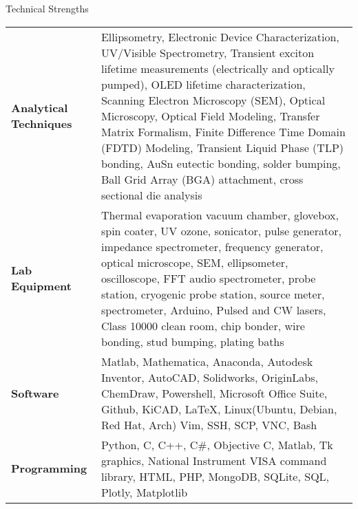 \documentclass{resume} %
\begin{document}
\begin{rSection}{Technical Strengths}

\begin{tabular}{ @{} >{\bfseries}l @{\hspace{3ex}} p{12.5cm} }
Analytical Techniques & Ellipsometry, Electronic Device Characterization, UV/Visible Spectrometry, Transient exciton lifetime measurements (electrically and optically pumped), OLED lifetime characterization, Scanning Electron Microscopy (SEM), Optical Microscopy, Optical Field Modeling, Transfer Matrix Formalism, Finite Difference Time Domain (FDTD) Modeling, Transient Liquid Phase (TLP) bonding, AuSn eutectic bonding, solder bumping, Ball Grid Array (BGA) attachment, cross sectional die analysis \\
Lab Equipment & Thermal evaporation vacuum chamber, glovebox, spin coater, UV ozone, sonicator, pulse generator, impedance spectrometer, frequency generator, optical microscope, SEM, ellipsometer, oscilloscope, FFT audio spectrometer, probe station, cryogenic probe station, source meter, spectrometer, Arduino, Pulsed and CW lasers, Class 10000 clean room, chip bonder, wire bonding, stud bumping, plating baths \\
Software & Matlab, Mathematica, Anaconda, Autodesk Inventor, AutoCAD, Solidworks, OriginLabs, ChemDraw, Powershell, Microsoft Office Suite, Github, KiCAD, \LaTeX , Linux(Ubuntu, Debian, Red Hat, Arch) Vim, SSH, SCP, VNC, Bash \\
Programming & Python, C, C++, C\#, Objective C, Matlab, Tk graphics, National Instrument VISA command library, HTML, PHP, MongoDB, SQLite, SQL, Plotly, Matplotlib \\
\end{tabular}

\end{rSection}

\end{document}
